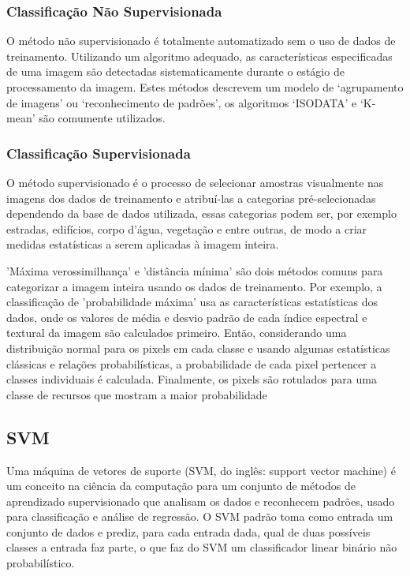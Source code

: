 \documentclass{article}
\begin{document}
\subsubsection{Classificação Não Supervisionada}

O método não supervisionado é totalmente automatizado sem o uso de dados de treinamento. Utilizando um algoritmo adequado, as características especificadas de uma imagem são detectadas sistematicamente durante o estágio de processamento da imagem. Estes métodos descrevem um modelo de ‘agrupamento de imagens’ ou ‘reconhecimento de padrões’, os algoritmos ‘ISODATA’ e ‘K-mean’ são comumente utilizados.

\subsubsection{Classificação Supervisionada}

O método supervisionado é o processo de selecionar amostras visualmente nas imagens dos dados de treinamento e atribuí-las a categorias pré-selecionadas dependendo da base de dados utilizada, essas categorias podem ser, por exemplo estradas, edifícios, corpo d'água, vegetação e entre outras, de modo a criar medidas estatísticas a serem aplicadas à imagem inteira. 

'Máxima verossimilhança' e 'distância mínima' são dois métodos comuns para categorizar a imagem inteira usando os dados de treinamento. Por exemplo, a classificação de 'probabilidade máxima' usa as características estatísticas dos dados, onde os valores de média e desvio padrão de cada índice espectral e textural da imagem são calculados primeiro. Então, considerando uma distribuição normal para os pixels em cada classe e usando algumas estatísticas clássicas e relações probabilísticas, a probabilidade de cada pixel pertencer a classes individuais é calculada. Finalmente, os pixels são rotulados para uma classe de recursos que mostram a maior probabilidade

\subsection{SVM}
Uma máquina de vetores de suporte (SVM, do inglês: support vector machine) é um conceito na ciência da computação para um conjunto de métodos de aprendizado supervisionado que analisam os dados e reconhecem padrões, usado para classificação e análise de regressão. O SVM padrão toma como entrada um conjunto de dados e prediz, para cada entrada dada, qual de duas possíveis classes a entrada faz parte, o que faz do SVM um classificador linear binário não probabilístico. 
\end{document}
